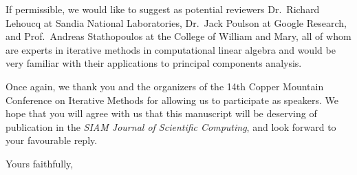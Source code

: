 \documentclass{letter}
\begin{document}
If permissible, we would like to suggest as potential reviewers Dr.\
Richard Lehoucq at Sandia National Laboratories, Dr.\ Jack Poulson at
Google Research, and Prof.\ Andreas Stathopoulos at the College of
William and Mary, all of whom are experts in iterative methods in
computational linear algebra and would be very familiar with their
applications to principal components analysis.

Once again, we thank you and the organizers of the 14th Copper
Mountain Conference on Iterative Methods for allowing us to
participate as speakers. We hope that you will agree with us that this
manuscript will be deserving of publication in the \textit{SIAM
Journal of Scientific Computing}, and look forward to your favourable
reply.

\closing{Yours faithfully,}
\end{document}
